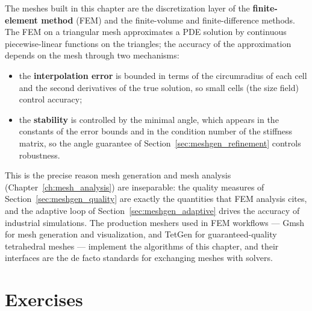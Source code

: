 The meshes built in this chapter are the discretization layer of the
\textbf{finite-element method} (FEM) and the
finite-volume and finite-difference methods. The FEM on a triangular mesh
approximates a PDE solution by continuous piecewise-linear functions on the
triangles; the accuracy of the approximation depends on the mesh through
two mechanisms:
\begin{itemize}
  \item the \textbf{interpolation error} is bounded in terms of the
    circumradius of each cell and the second derivatives of the true
    solution, so small cells (the size field) control accuracy;
  \item the \textbf{stability} is controlled by the minimal angle, which
    appears in the constants of the error bounds and in the condition
    number of the stiffness matrix, so the angle guarantee of
    Section~\ref{sec:meshgen_refinement} controls robustness.
\end{itemize}
This is the precise reason mesh generation and mesh analysis
(Chapter~\ref{ch:mesh_analysis}) are inseparable: the quality measures of
Section~\ref{sec:meshgen_quality} are exactly the quantities that FEM
analysis cites, and the adaptive loop of Section~\ref{sec:meshgen_adaptive}
drives the accuracy of industrial simulations. The production meshers used
in FEM workflows --- Gmsh \cite{geuzaine2009} for mesh generation and
visualization, and TetGen \cite{si2015} for guaranteed-quality tetrahedral
meshes --- implement the algorithms of this chapter, and their interfaces
are the de facto standards for exchanging meshes with solvers.

\section{Exercises}
\label{sec:meshgen_exercises}

